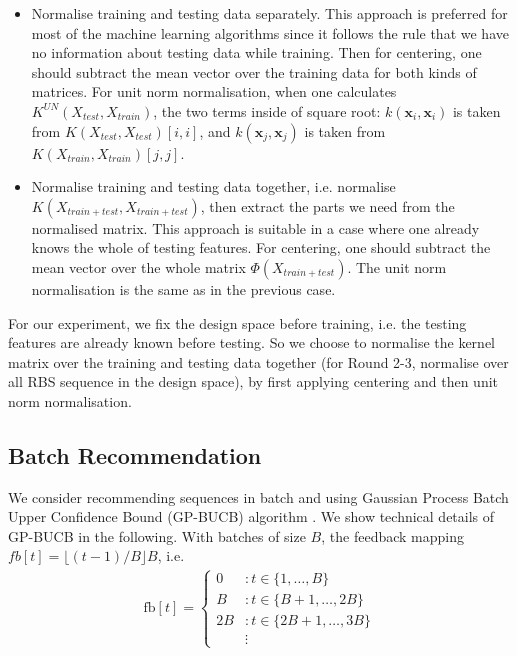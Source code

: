 \documentclass{scrartcl}[2013/05/29]%
\begin{document}
\begin{itemize}
    \item Normalise training and testing data separately.
    This approach is preferred for most of the machine learning algorithms since it follows the rule that we have no information about testing data while training.
    Then for centering, one should subtract the mean vector over the training data for both kinds of matrices.
    For unit norm normalisation, when one calculates $K^{UN}(X_{test}, X_{train})$, the two terms inside of square root: $k(\mathbf{x}_i, \mathbf{x}_i)$ is taken from $K(X_{test}, X_{test})[i,i]$, and $k(\mathbf{x}_j, \mathbf{x}_j)$ is taken from $K(X_{train}, X_{train})[j,j]$.
    
    \item Normalise training and testing data together, i.e. normalise $K(X_{train+test}, X_{train+test})$, then extract the parts we need from the normalised matrix. 
    This approach is suitable in a case where one already knows the whole of testing features. 
    For centering, one should subtract the mean vector over the whole matrix $\Phi(X_{train+test})$. 
    The unit norm normalisation is the same as in the previous case. 
\end{itemize}

For our experiment, we fix the design space before training, i.e. the testing features are already known before testing. 
So we choose to normalise the kernel matrix over the training and testing data together (for Round 2-3, normalise over all RBS sequence in the design space),
by first applying centering and then unit norm normalisation. 

\subsection{Batch Recommendation}

We consider recommending sequences in batch and using Gaussian Process Batch Upper Confidence Bound (GP-BUCB) algorithm  \cite{desautels2014parallelizing}.
We show technical details of GP-BUCB in the following.
With batches of size $B$, the feedback mapping $fb[t] = \lfloor(t-1) / B\rfloor B$, i.e. 
\begin{align}
    \mathrm{fb}[t]=\left\{\begin{array}{cl}
    0 & : t \in\{1, \ldots, B\} \\
    B & : t \in\{B+1, \ldots, 2 B\} \\
    2 B & : t \in\{2 B+1, \ldots, 3 B\} \\
    & \vdots
    \end{array}\right.
\end{align}
\end{document}
